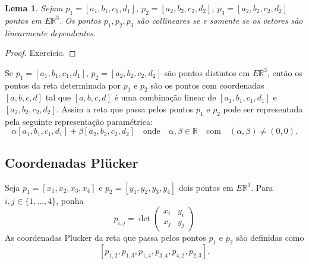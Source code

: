\documentclass[12pt]{amsart}
\newcommand{\R}{\mathbb R}
\newtheorem{lemma}[theorem]{Lema}
\theoremstyle{definition}
\begin{document}
\begin{lemma}
    Sejam $p_1=[a_1,b_1,c_1,d_1]$, $p_2=[a_2,b_2,c_2,d_2]$, $p_3=[a_2,b_2,c_2,d_2]$ pontos em $E\R^3$.
    Os pontos $p_1,p_2,p_3$ são collineares se e somente se os vetores são linearmente dependentes.   
\end{lemma}
\begin{proof}
    Exercício.
\end{proof}

Se $p_1=[a_1,b_1,c_1,d_1]$, $p_2=[a_2,b_2,c_2,d_2]$ são pontos distintos em $E\R^3$, então os pontos 
da reta determinada por $p_1$ e $p_2$ são os pontos com coordenadas $[a,b,c,d]$ tal que 
$[a,b,c,d]$ é uma combinação linear de $[a_1,b_1,c_1,d_1]$ e $[a_2,b_2,c_2,d_2]$. Assim a reta que passa
pelos pontos $p_1$ e $p_2$ pode ser representada pela seguinte representação paramétrica:
\[
    \alpha[a_1,b_1,c_1,d_1]+\beta[a_2,b_2,c_2,d_2]\quad\mbox{onde}\quad \alpha,\beta\in\R
    \quad\mbox{com}\quad (\alpha,\beta)\neq (0,0).
\]

\subsection{Coordenadas Pl\"ucker}
Seja $p_1=[x_1,x_2,x_3,x_4]$ e $p_2=[y_1,y_2,y_3,y_4]$ dois pontos em $E\R^3$. Para $i,j\in\{1,\ldots,4\}$,  
ponha 
\[
    p_{i,j}=\det\begin{pmatrix} x_i & y_i\\ x_j & y_j\end{pmatrix}
\]
As coordenadas Plucker da reta que passa pelos pontos $p_1$ e $p_2$ são definidas como 
\[
    [p_{1,2},p_{1,3},p_{1,4},p_{3,4},p_{4,2},p_{2,3}].
\]
\end{document}
